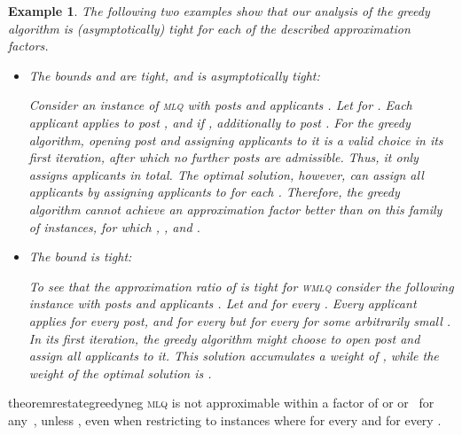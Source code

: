 \documentclass{llncs}
\newtheorem{ex}[theorem]{Example}
\begin{document}
\begin{ex}
The following two examples show that our analysis of the greedy algorithm is (asymptotically) tight for each of the described approximation factors.

\begin{itemize}
  \item[(a)] The bounds  and  are tight, and  is asymptotically tight:
  
  Consider an instance of \textsc{mlq} with  posts  and  applicants . Let  for . Each applicant  applies to post , and if , additionally to post .
   For the greedy algorithm, opening post  and assigning applicants  to it is a valid choice in its first iteration, after which no further posts are admissible. Thus, it only assigns  applicants in total. The optimal solution, however, can assign all  applicants by assigning applicants  to  for each . Therefore, the greedy algorithm cannot achieve an approximation factor better than  on this family of instances, for which , , and .
   
  \item[(b)] The bound  is tight:
  
  To see that the approximation ratio of  is  tight for \textsc{wmlq} consider the following instance with  posts  and  applicants . Let  and  for every . Every applicant applies for every post, and  for every  but  for every  for some arbitrarily small . In its first iteration, the greedy algorithm might choose to open post  and assign all applicants to it. This solution accumulates a weight of , while the weight of the optimal solution is .
  \end{itemize}
\end{ex}

\begin{restatable}{theorem}{restategreedyneg}
\label{th:inappr}
	\textsc{mlq} is not approximable within a factor of  or  or~ for any~, unless , even when restricting to instances where  for every  and  for every .
\end{restatable}
\end{document}
